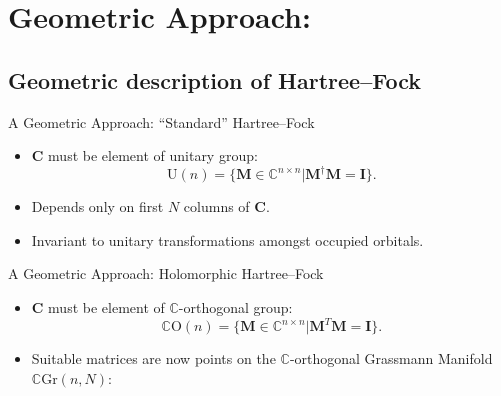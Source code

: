 \documentclass{beamer}
\begin{document}
\section{Geometric Approach:}
\subsection{Geometric description of Hartree--Fock}
\begin{frame}{A Geometric Approach: ``Standard'' Hartree--Fock}
\begin{itemize}
  \item<1-> $\mathbf{C}$ must be element of unitary group:
  $$\mathrm{U} \left( n \right) = \{ \mathbf{M} \in \mathbb{C}^{n \times n} | \mathbf{M}^{\dagger} \mathbf{M} = \mathbf{I} \}.$$
\end{itemize}
\vspace{-1em}
\begin{itemize}
  \item<2-> Depends only on first $N$ columns of $\mathbf{C}.$
  \item<2-> Invariant to unitary transformations amongst occupied orbitals.
\end{itemize}
\end{frame}

\begin{frame}{A Geometric Approach: Holomorphic Hartree--Fock}
\begin{itemize}
  \item<1-> $\mathbf{C}$ must be element of $\mathbb{C}$-orthogonal group:
  $$\mathbb{C}\mathrm{O} \left( n \right) = \{ \mathbf{M} \in \mathbb{C}^{n \times n} | \mathbf{M}^{T} \mathbf{M} = \mathbf{I} \}.$$
\end{itemize}
\vspace{-1em}
\begin{itemize}
\item<3-> Suitable matrices are now points on the \alert{$\mathbb{C}$-orthogonal} Grassmann Manifold $\mathbb{C}\mathrm{Gr}(n,N):$
\end{itemize}
\end{frame}
\end{document}
